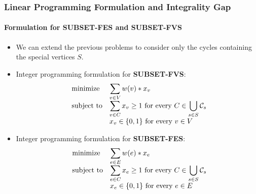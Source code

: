 \documentclass[10pt]{beamer}
\begin{document}
\begin{frame}
    \frametitle{Linear Programming Formulation and Integrality Gap}
    \framesubtitle{Formulation for SUBSET-FES and SUBSET-FVS}
    \begin{itemize}
        \item We can extend the previous problems to consider only the cycles containing the special vertices \(S\).
        \item Integer programming formulation for \textbf{SUBSET-FVS}:
        \begin{equation*}
            \begin{array}{ll@{}ll}
                \text{minimize}  & \displaystyle\sum_{v\in V} w(v) * x_v \\
                \text{subject to}& \displaystyle\sum_{v\in C} x_v \geq 1  \text{ for every } C \in \bigcup_{s\in S} \mathcal{C}_s\\
                                 & x_v \in \{0, 1\} \text{ for every } v \in V\\
            \end{array}
        \end{equation*}

        \item Integer programming formulation for \textbf{SUBSET-FES}:
        \begin{equation*}
            \begin{array}{ll@{}ll}
                \text{minimize}  & \displaystyle\sum_{e\in E} w(e) * x_e \\
                \text{subject to}& \displaystyle\sum_{e\in C} x_e \geq 1  \text{ for every } C \in \bigcup_{s\in S} \mathcal{C}_s\\
                                    & x_e \in \{0, 1\} \text{ for every } e \in E\\
            \end{array}
        \end{equation*}
\end{itemize}
\end{frame}
\end{document}
